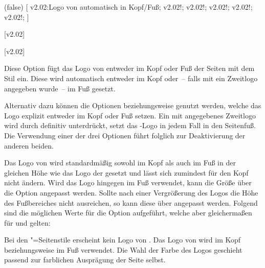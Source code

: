 \begin{DeclareEntity*}{}
\begin{DeclareEntity*}{}
\begin{DeclareEntity*}{}
\begin{Declaration}
  {}
  (false)
[%
  v2.02:Logo von \DDC automatisch in Kopf/Fuß;%
  v2.02!;
  v2.02!;
  v2.02!;
  v2.02!;
  v2.02!;
]
\begin{Declaration}
  {}
  [v2.02]
\begin{Declaration}
  {}
  [v2.02]

Diese Option fügt das Logo von \DDC entweder im Kopf oder Fuß der Seiten mit 
dem Stil  ein. Diese wird automatisch entweder im Kopf 
oder~-- falls mit  ein Zweitlogo angegeben wurde~-- im Fuß 
gesetzt.

Alternativ dazu können die Optionen  beziehungsweise 
 genutzt werden, welche das Logo explizit entweder im Kopf oder 
Fuß setzen. Ein mit  angegebenes Zweitlogo wird durch 
 definitiv unterdrückt,  setzt 
das \DDC-Logo in jedem Fall in den Seitenfuß. Die Verwendung einer der drei 
Optionen führt folglich zur Deaktivierung der anderen beiden.

Das Logo von \DDC wird standardmäßig sowohl im Kopf als auch im Fuß in der 
gleichen Höhe wie das Logo der \TnUD gesetzt und lässt sich zumindest für den 
Kopf nicht ändern. Wird das Logo hingegen im Fuß verwendet, kann die Größe über 
die Option  angepasst werden. Sollte nach einer 
Vergrößerung des Logos die Höhe des Fußbereiches nicht ausreichen, so kann 
diese über  angepasst werden. Folgend sind 
die möglichen Werte für die Option  aufgeführt, welche aber 
gleichermaßen für  und  gelten:
\begin{DeclareValues}
  Bei den "=Seitenstile erscheint kein Logo von \DDC.
  Das Logo von \DDC wird im Kopf beziehungsweise im Fuß verwendet. Die Wahl der 
  Farbe des Logos geschieht passend zur farblichen Ausprägung der Seite selbst.
\end{DeclareValues}


\end{Declaration}
\end{Declaration}
\end{Declaration}
\end{DeclareEntity*}
\end{DeclareEntity*}
\end{DeclareEntity*}
